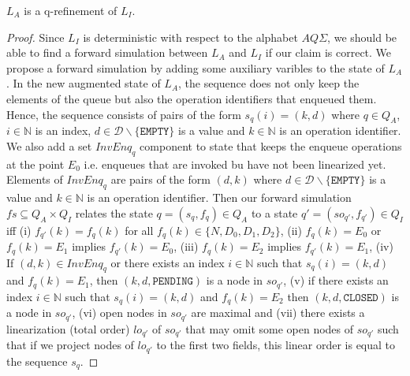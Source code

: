 \begin{lem}
$L_A$ is a q-refinement of $L_I$.
\end{lem}
\begin{proof}
Since $L_I$ is deterministic with respect to the alphabet $AQ\Sigma$, we should be able to find a forward simulation between $L_A$ and $L_I$ if our claim is correct. We propose a forward simulation by adding some auxiliary varibles to the state of $L_A$. In the new augmented state of $L_A$, the sequence does not only keep the elements of the queue but also the operation identifiers that enqueued them. Hence, the sequence consists of  pairs of the form $s_q(i) = (k,d)$ where $q \in Q_A$, $i \in \mathbb{N}$ is an index, $d \in \mathcal{D}\backslash \{ \texttt{EMPTY} \}$ is a value and $k \in \mathbb{N}$ is an operation identifier. We also add a set $InvEnq_q$ component to state that keeps the enqueue operations at the point $E_0$ i.e. enqueues that are invoked bu have not been linearized yet. Elements of $InvEnq_q$ are pairs of the form $(d,k)$ where  $d \in \mathcal{D}\backslash \{ \texttt{EMPTY} \}$ is a value and $k \in \mathbb{N}$ is an operation identifier. Then our forward simulation $fs \subseteq Q_A \times Q_I$ relates the state $q = (s_q, f_q) \in Q_A$ to a state $q' =(so_{q'}, f_{q'}) \in Q_I$ iff (i) $f_{q'}(k) = f_q(k)$ for all $f_q(k) \in \{N, D_0, D_1, D_2\}$, (ii) $f_q(k) = E_0$ or $f_q(k) = E_1$ implies $f_{q'}(k) = E_0$, (iii) $f_q(k) = E_2$ implies $f_{q'}(k) = E_1$, (iv) If $(d,k) \in InvEnq_q$ or there exists an index $i \in \mathbb{N}$ such that $s_q(i) = (k,d)$ and $f_q(k) = E_1$, then $(k,d,\texttt{PENDING})$ is a node in $so_{q'}$, (v) if there exists an index $i \in \mathbb{N}$ such that $s_q(i) = (k,d)$ and $f_q(k) = E_2$ then $(k,d,\texttt{CLOSED})$ is a node in $so_{q'}$, (vi) open nodes in $so_{q'}$ are maximal and (vii) there exists a linearization (total order) $lo_{q'}$ of $so_{q'}$ that may omit some open nodes of $so_{q'}$ such that if we project nodes of
$lo_{q'}$ to the first two fields, this linear order is equal to the sequence $s_q$.


\end{proof}
